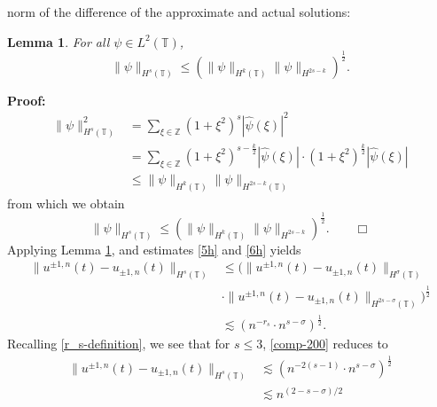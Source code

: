 \documentclass[12pt,reqno]{amsart}
\newcommand{\zz}{\mathbb{Z}}
\newcommand{\ci}{\mathbb{T}}
\theoremstyle{plain}  %
\newtheorem{lemma}{Lemma}
\theoremstyle{definition}
\begin{document}
		norm of the difference of the approximate and actual solutions:
		\begin{lemma}
			\label{7h}
			For all $\psi \in L^2(\ci)$,
			\begin{equation*}
				\|\psi \|_{H^s (\ci)} \leq \left( \| \psi \|_{H^k (\ci)} \| \psi
				\|_{H^{2s - k}} \right)^{\frac{1}{2}}.
			\end{equation*}
		\end{lemma}
		{\bf{Proof:}}
			\begin{equation*}
				\begin{split}
					\|\psi\|^2_{H^s (\ci)} & = \sum_{\xi \in \zz} (1 + 
					\xi^2)^s |\hat{\psi}(\xi) |^2
				\\
				& = \sum_{\xi \in \zz} (1 + \xi^2)^{s - 
				\frac{k}{2}}|\hat{\psi}(\xi)| \cdot
				( 1 + \xi^2)^{\frac{k}{2}}|\hat{\psi}(\xi)|
				\\
				& \le \|\psi\|_{H^k(\ci)}
				\|\psi\|_{H^{2s - k}(\ci)}
			\end{split}
			\end{equation*}
			from which we obtain 
		\begin{equation*}
				\|\psi \|_{H^s (\ci)} \leq \left( \| \psi \|_{H^k (\ci)} \| \psi
				\|_{H^{2s - k}} \right)^{\frac{1}{2}}. \qquad \Box
			\end{equation*}
			Applying Lemma \ref{7h}, and estimates \eqref{5h} and \eqref{6h}
			yields
			\begin{equation}
				\label{comp-200}
				\begin{split}
					\|u^{\pm 1,n}(t) - u_{\pm 1, n}(t) \|_{H^s (\ci)}
					& \le ( \| u^{\pm 1,n}(t)
					- u_{\pm 1, n}(t) \|_{H^\sigma (\ci)}
					\\
					& \cdot \| u^{\pm 1,n}(t)
					- u_{\pm 1, n}(t)\|_{H^{2s - \sigma}(\ci)} )^{\frac{1}{2}}
					\\
					& \lesssim (n^{-r_s} \cdot n^{s-\sigma})^{\frac{1}{2}}.
				\end{split}
			\end{equation}
			Recalling \eqref{r_s-definition}, we see that for $s \le 3$,
			\eqref{comp-200} reduces to 
			\begin{equation}
				\begin{split}
					\|u^{\pm 1,n}(t) - u_{\pm 1, n}(t) \|_{H^s (\ci)}
					& \lesssim (n^{-2(s-1)} \cdot n^{s-\sigma})^{\frac{1}{2}}
					\\
					& \lesssim n^{(2-s - \sigma)/2}
					\label{8h}
				\end{split}
			\end{equation}
\end{document}
